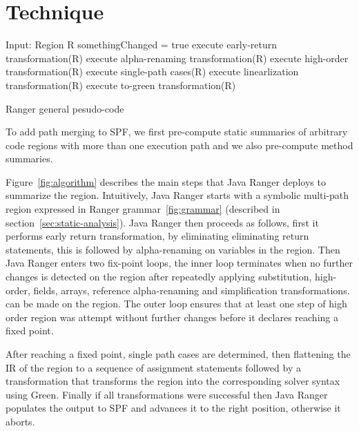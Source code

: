 \section{Technique}
\label{sec:technique}
%

\begin{algorithm}[]
\SetAlgoLined
Input: Region R\;
 somethingChanged = true\;
 execute early-return transformation(R)\;
 execute alpha-renaming transformation(R)\;
 {
	execute high-order transformation(R)\;}
	execute single-path cases(R)\;
	execute linearlization transformation(R)\;
	execute to-green transformation(R)\;
 \label{fig:algorithm}
  \caption{Ranger general pesudo-code}
\end{algorithm}

%
To add path merging to SPF, we first pre-compute static summaries of arbitrary code regions with more than one execution
path and we also pre-compute method summaries. 

Figure~\ref{fig:algorithm} describes the main steps that Java Ranger deploys to summarize the region. Intuitively, Java Ranger starts with a symbolic multi-path region expressed in Ranger grammar~\ref{fig:grammar} (described in section~\ref{sec:static-analysis}). Java Ranger then proceeds as follows, first it performs early return transformation, by eliminating eliminating return statements, this is followed by alpha-renaming on variables in the region. Then Java Ranger enters two fix-point loops, the inner loop terminates when no further changes is detected on the region after repeatedly applying substitution, high-order, fields, arrays, reference alpha-renaming and simplification transformations. can be made on the region. The outer loop ensures that at least one step of high order region was attempt without further changes before it declares reaching a fixed point. 

After reaching a fixed point, single path cases are determined, then flattening the IR of the region to a sequence of assignment statements followed by a transformation that transforms the region into the corresponding solver syntax using Green. Finally if all transformations were successful then Java Ranger populates the output to SPF and advances it to the right position, otherwise it aborts. 

